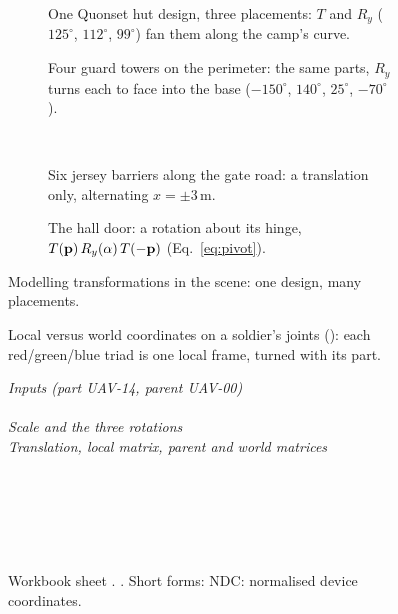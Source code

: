 \begin{figure}[htbp]
\centering
\begin{subfigure}[t]{0.49\linewidth}\caption{One Quonset hut design, three
placements: $T$ and $R_y$ ($125^\circ$, $112^\circ$, $99^\circ$) fan them along the camp's curve.}\end{subfigure}\hfill
\begin{subfigure}[t]{0.49\linewidth}\caption{Four guard towers on the perimeter: the
same parts, $R_y$ turns each to face into the base ($-150^\circ$, $140^\circ$, $25^\circ$, $-70^\circ$).}\end{subfigure}\\[1.2mm]
\begin{subfigure}[t]{0.49\linewidth}\caption{Six jersey barriers along the gate
road: a translation only, alternating $x=\pm3$\,m.}\end{subfigure}\hfill
\begin{subfigure}[t]{0.49\linewidth}\caption{The hall door: a rotation about its
hinge, $T(\mathbf{p})\,R_y(\alpha)\,T(-\mathbf{p})$ (Eq.~\eqref{eq:pivot}).}\end{subfigure}
\caption{Modelling transformations in the scene: one design, many placements.}
\label{fig:trs-scene}
\end{figure}

\begin{figure}[htbp]
\centering
{}
\caption{Local versus world coordinates on a soldier's joints (): each red/green/blue triad is one local
frame, turned with its part.}
\label{fig:axes}
\end{figure}

\begin{figure}[htbp]
\centering
{\footnotesize\textit{Inputs (part UAV-14, parent UAV-00)}}\\[0.5mm]
\\[1mm]
{\footnotesize\textit{Scale and the three rotations}}\\[0.5mm]
{\footnotesize\textit{Translation, local matrix, parent and world matrices}}\\[0.5mm]
\begin{minipage}[t]{0.6\linewidth}\\[0.5mm]
\end{minipage}\hfill
\begin{minipage}[t]{0.38\linewidth}\\[0.5mm]
\end{minipage}\\[1mm]
{\footnotesize\wbkey}
\caption{Workbook sheet . . Short forms: NDC: normalised device coordinates.}
\label{fig:wb-trace}
\end{figure}

